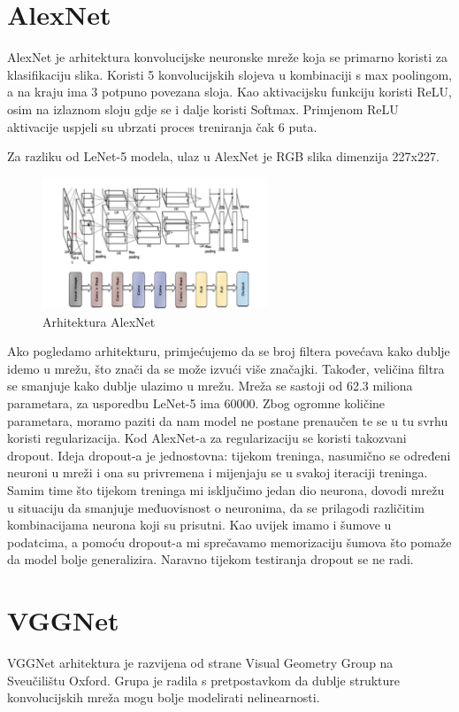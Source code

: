 \section{AlexNet}\label{sec:alexnet}
AlexNet je arhitektura konvolucijske neuronske mreže koja se primarno koristi za klasifikaciju slika. Koristi 5 konvolucijskih slojeva u kombinaciji s max poolingom, a na kraju ima 3 potpuno povezana sloja. Kao aktivacijsku funkciju koristi ReLU, osim na izlaznom sloju gdje se i dalje koristi Softmax. Primjenom ReLU aktivacije uspjeli su ubrzati proces treniranja čak 6 puta.

Za razliku od LeNet-5 modela, ulaz u AlexNet je RGB slika dimenzija 227x227.
\FloatBarrier
\begin{figure}[h]
    \centering
    \includegraphics[width=0.6\textwidth]{images/AlexNet}
    \caption{Arhitektura AlexNet}
    \label{fig:slika9}
\end{figure}
\FloatBarrier

Ako pogledamo arhitekturu, primjećujemo da se broj filtera povećava kako dublje idemo u mrežu, što znači da se može izvući više značajki.
Također, veličina filtra se smanjuje kako dublje ulazimo u mrežu.
Mreža se sastoji od 62.3 miliona parametara, za usporedbu LeNet-5 ima 60000.
Zbog ogromne količine parametara, moramo paziti da nam model ne postane prenaučen te se u tu svrhu koristi regularizacija.
Kod AlexNet-a za regularizaciju se koristi takozvani dropout.
Ideja dropout-a je jednostovna: tijekom treninga, nasumično se  određeni neuroni u mreži i ona su privremena i mijenjaju se u svakoj iteraciji treninga.
Samim time što tijekom treninga mi isključimo jedan dio neurona, dovodi mrežu u situaciju da smanjuje međuovisnost o neuronima, da se prilagodi različitim kombinacijama neurona koji su prisutni.
Kao uvijek imamo i šumove u podatcima, a pomoću dropout-a mi sprečavamo memorizaciju šumova što pomaže da model bolje generalizira.
Naravno tijekom testiranja dropout se ne radi.

\section{VGGNet}\label{sec:vggnet}
VGGNet arhitektura je razvijena od strane Visual Geometry Group na Sveučilištu Oxford.
Grupa je radila s pretpostavkom da dublje strukture konvolucijskih mreža mogu bolje modelirati nelinearnosti.

